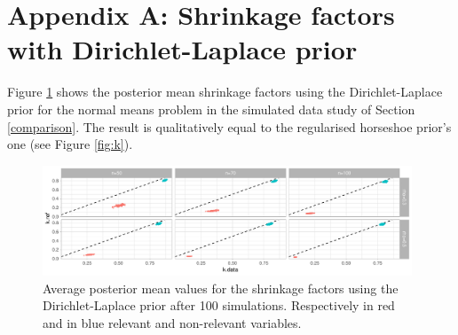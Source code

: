 \documentclass[american,]{article}
\theoremstyle{definition}
\begin{document}
 


\appendix

\hypertarget{ap:shrinkage_signal}{%
\section*{Appendix A: Shrinkage factors with Dirichlet-Laplace prior}\label{ap:shrinkage_signal}}
Figure \ref{fig:k_DL} shows the posterior mean shrinkage factors using the Dirichlet-Laplace prior for the normal means problem in the simulated data study of Section \ref{comparison}. The result is qualitatively equal to the regularised horseshoe prior's one (see Figure \ref{fig:k}). 

\begin{figure}[tp]
  \centering
  \includegraphics[width=0.98\textwidth]{graphics/k_DL.pdf}
  \caption{Average posterior mean values for the shrinkage factors using the Dirichlet-Laplace prior after 100 simulations. Respectively in red and in blue relevant and non-relevant variables.\\}
  \label{fig:k_DL}
\end{figure}
\end{document}

